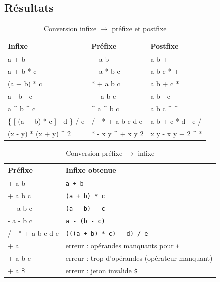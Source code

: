 \documentclass[11pt,a4paper]{article}
\newcommand{\code}[1]{\texttt{#1}}
\begin{document}
\subsection{Résultats}

\begin{table}[H]
\centering
\small
\begin{tabular}{>{\ttfamily}l >{\ttfamily}l >{\ttfamily}l}
  \toprule
  \normalfont\textbf{Infixe} & \normalfont\textbf{Préfixe} & \normalfont\textbf{Postfixe} \\
  \midrule
  a + b                        & + a b             & a b + \\
  a + b * c                    & + a * b c         & a b c * + \\
  (a + b) * c                  & * + a b c         & a b + c * \\
  a - b - c                    & - - a b c         & a b - c - \\
  a \textasciicircum{} b \textasciicircum{} c & \textasciicircum{} a \textasciicircum{} b c & a b c \textasciicircum{} \textasciicircum{} \\
  \{ [ (a + b) * c ] - d \} / e & / - * + a b c d e & a b + c * d - e / \\
  (x - y) * (x + y) \textasciicircum{} 2 & * - x y \textasciicircum{} + x y 2 & x y - x y + 2 \textasciicircum{} * \\
  \bottomrule
\end{tabular}
\caption{Conversion infixe $\to$ préfixe et postfixe}
\end{table}

\begin{table}[H]
\centering
\small
\begin{tabular}{>{\ttfamily}l l}
  \toprule
  \normalfont\textbf{Préfixe} & \textbf{Infixe obtenue} \\
  \midrule
  + a b               & \code{a + b} \\
  * + a b c           & \code{(a + b) * c} \\
  - - a b c           & \code{(a - b) - c} \\
  - a - b c           & \code{a - (b - c)} \\
  / - * + a b c d e   & \code{(((a + b) * c) - d) / e} \\
  \midrule
  + a                 & erreur : opérandes manquants pour \code{+} \\
  + a b c             & erreur : trop d'opérandes (opérateur manquant) \\
  + a \$              & erreur : jeton invalide \code{\$} \\
  \bottomrule
\end{tabular}
\caption{Conversion préfixe $\to$ infixe}
\end{table}
\end{document}
